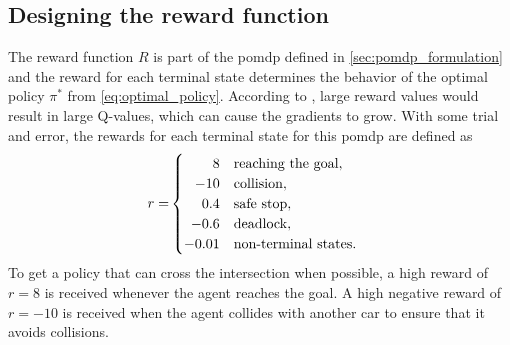 \subsection{Designing the reward function}
The reward function $R$ is part of the \gls{pomdp} defined in \ref{sec:pomdp_formulation} and the reward for each terminal state determines the behavior of the optimal policy $\pi^*$ from \eqref{eq:optimal_policy}. 
According to \cite{Hasselt2016}, large reward values would result in large Q-values, which can cause the gradients to grow. With some trial and error, the rewards for each terminal state for this \gls{pomdp} are defined as
\begin{align*}
r = & \begin{cases}
\hfill 8 & \text{reaching the goal},\\
\hfill -10 & \text{collision},\\
\hfill 0.4 & \text{safe stop},\\
\hfill -0.6 & \text{deadlock}, \\
-0.01 & \text{non-terminal states}.
\label{eq:reward_values}
\end{cases} 
\end{align*}
To get a policy that can cross the intersection when possible, a high reward of $r=8$ is received whenever the agent reaches the goal. A high negative reward of $r=-10$ is received when the agent collides with another car to ensure that it avoids collisions. 

